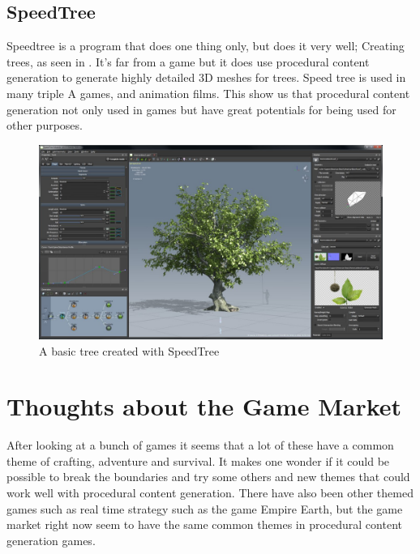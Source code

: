 \subsection{SpeedTree}

Speedtree\cite{SpeedTree} is a program that does one thing only, but does it very well; Creating trees, as seen in . It's far from a game but it does use procedural content generation to generate highly detailed 3D meshes for trees. Speed tree is used in many triple A games, and animation films. This show us that procedural content generation not only used in games but have great potentials for being used for other purposes.

\begin{figure}[H]
	\includegraphics[width=0.7\linewidth]{img/SpeedTree}
	\centering
	\caption{A basic tree created with SpeedTree}
	\label{fig:SpeedTree}
\end{figure}


\section{Thoughts about the Game Market}

After looking at a bunch of games it seems that a lot of these have a common theme of crafting, adventure and survival. It makes one wonder if it could be possible to break the boundaries and try some others and new themes that could work well with procedural content generation. There have also been other themed games such as real time strategy such as the game Empire Earth, but the game market right now seem to have the same common themes in procedural content generation games.